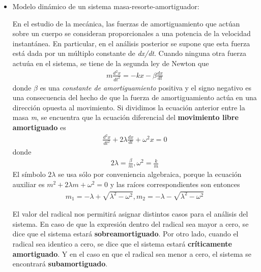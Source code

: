 \documentclass[12pt, letterpaper]{article}
\begin{document}
\begin{itemize}
	\item Modelo dinámico de un sistema masa-resorte-amortiguador:

		En el estudio de la mecánica, las fuerzas de amortiguamiento que actúan sobre un cuerpo se consideran proporcionales a una potencia de la velocidad instantánea. En particular, en el análisis posterior se supone que esta fuerza está dada por un múltiplo constante de \textit{dx/dt}. Cuando ninguna otra fuerza actuúa en el sistema, se tiene de la segunda ley de Newton que
		\begin{align}
			m \frac{d^2 x}{dt^2} = -kx - \beta \frac{dx}{dt}
		\end{align}
		donde $\beta$ es una \textit{constante de amortiguamiento} positiva y el signo negativo es una consecuencia del hecho de que la fuerza de amortiguamiento actúa en una dirección opuesta al movimiento. Si dividimos la ecuación anterior entre la masa \textit{m}, se encuentra que la ecuación diferencial del \textbf{movimiento libre amortiguado} es
		\begin{align}
			\frac{d^2 x}{dt^2} + 2 \lambda \frac{dx}{dt} + \omega ^2 x = 0
		\end{align}
		donde
		\begin{align*}
		2\lambda = \frac{\beta}{m} , \omega ^2 = \frac{k}{m}
		\end{align*}
El símbolo $2\lambda$ se usa sólo por conveniencia algebraica, porque la ecuación auxiliar es $m^2 + 2\lambda m + \omega ^2 = 0$ y las raíces correspondientes son entonces
		\begin{align*}
m_1 = -\lambda + \sqrt{\lambda ^2 - \omega ^2}, m_2 = -\lambda - \sqrt{\lambda ^2 - \omega ^2}
		\end{align*}

El valor del radical nos permitirá asignar distintos casos para el análisis del sistema. En caso de que la expresión dentro del radical sea mayor a cero, se dice que el sistema estará \textbf{sobreamortiguado}. Por otro lado, cuando el radical sea identico a cero, se dice que el sistema estará \textbf{críticamente amortiguado}. Y en el caso en que el radical sea menor a cero, el sistema se encontrará \textbf{subamortiguado}. \autocite{zill09}	
\end{itemize}
\renewcommand\refname{Referencias}
\printbibliography
\end{document}
